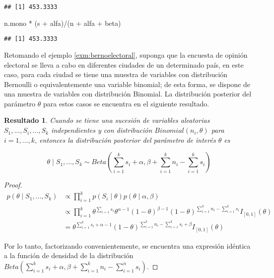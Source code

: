 \documentclass[
  12pt,
  spanish,
]{book}
\newenvironment{Shaded}{\begin{snugshade}}{\end{snugshade}}
\newcommand{\NormalTok}[1]{#1}
\newcommand{\SpecialCharTok}[1]{\textcolor[rgb]{0.00,0.00,0.00}{#1}}
\newtheorem{proposition}{Resultado}[chapter]
\theoremstyle{definition}
\theoremstyle{definition}
\theoremstyle{definition}
\theoremstyle{definition}
\theoremstyle{remark}
\begin{document}
\begin{verbatim}
## [1] 453.3333
\end{verbatim}

\begin{Shaded}
\begin{Highlighting}[]
\NormalTok{n.mono }\SpecialCharTok{*}\NormalTok{ (s }\SpecialCharTok{+}\NormalTok{ alfa)}\SpecialCharTok{/}\NormalTok{(n }\SpecialCharTok{+}\NormalTok{ alfa }\SpecialCharTok{+}\NormalTok{ beta)}
\end{Highlighting}
\end{Shaded}

\begin{verbatim}
## [1] 453.3333
\end{verbatim}

Retomando el ejemplo \ref{exm:bernoelectoral}, suponga que la encuesta de opinión electoral
se lleva a cabo en diferentes ciudades de un determinado país, en este
caso, para cada ciudad se tiene una muestra de variables con
distribución Bernoulli o equivalentemente una variable binomial; de esta
forma, se dispone de una muestra de variables con distribución Binomial.
La distribución posterior del parámetro \(\theta\) para estos casos se
encuentra en el siguiente resultado.

\begin{proposition}
\protect\hypertarget{prp:postbinom}{}{\label{prp:postbinom} }Cuando se tiene una sucesión de variables aleatorias \(S_1,\ldots,S_i, \ldots,S_k\) independientes y con distribución \(Binomial(n_i,\theta)\) para \(i=1,\ldots,k\), entonces la distribución posterior del parámetro de interés \(\theta\) es

\begin{equation*}
\theta \mid S_1,\ldots,S_k \sim Beta\left(\sum_{i=1}^ks_i+\alpha,\beta+\sum_{i=1}^k n_i-\sum_{i=1}^k s_i\right)
\end{equation*}
\end{proposition}

\begin{proof}
\iffalse{} {Prueba. } \fi{}\begin{align*}
p(\theta \mid S_1,\ldots,S_k)&\propto \prod_{i=1}^kp(S_i \mid \theta)p(\theta \mid \alpha,\beta)\\
&\propto \prod_{i=1}^k\theta^{\sum_{i=1}s_i}\theta^{\alpha-1}(1-\theta)^{\beta-1}
(1-\theta)^{\sum_{i=1}^kn_i-\sum_{i=1}^ks_i}I_{[0,1]}(\theta)\\
&= \theta^{\sum_{i=1}^ks_i+\alpha-1}(1-\theta)^{\sum_{i=1}^kn_i-\sum_{i=1}^ks_i+\beta}I_{[0,1]}(\theta)
\end{align*}

Por lo tanto, factorizando convenientemente, se encuentra una expresión idéntica a la función de densidad de la distribución \(Beta\left(\sum_{i=1}^ks_i+\alpha,\beta+\sum_{i=1}^k n_i-\sum_{i=1}^n s_i\right)\).
\end{proof}
\end{document}
